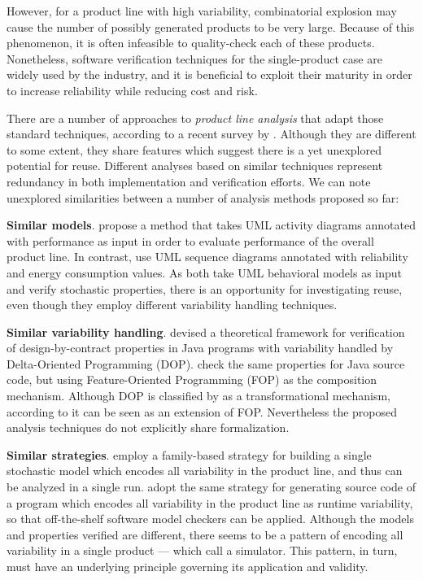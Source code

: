 However, for a product line with high variability, combinatorial explosion may
cause the number of possibly generated products to be very large. Because of
this phenomenon, it is often infeasible to quality-check each of these
products.
Nonetheless, software verification techniques for the single-product case
are widely used by the industry, and it is beneficial to exploit their
maturity in order to increase reliability while reducing cost and risk.

There are a number of approaches to \emph{product line analysis} that adapt those
standard techniques, according to a recent survey by \cite{Thum2014}.
Although they are different to some extent, they share features which suggest
there is a yet unexplored potential for reuse.
Different analyses based on similar techniques represent redundancy in both
implementation and verification efforts.
We can note unexplored similarities between a number of analysis methods proposed so far:


    \textbf{Similar models}. \cite{kowal_scaling_2015} propose a method that takes UML activity diagrams
        annotated with performance as input in order to evaluate performance
        of the overall product line.
        In contrast, \cite{Ghezzi2013} use UML sequence diagrams annotated
        with reliability and energy consumption values.
        As both take UML behavioral models as input and verify
        stochastic properties, there is an opportunity for investigating
        reuse, even though they employ different variability handling
        techniques.

    \textbf{Similar variability handling}. \cite{Hahnle2012} devised a theoretical framework for verification
        of design-by-contract properties in Java programs with variability
        handled by Delta-Oriented Programming (DOP).
        \cite{Thum2013} check the same properties for Java source code, but
        using Feature-Oriented Programming (FOP) as the composition mechanism.
        Although DOP is classified by \cite{DOPTransformational} as a
        transformational mechanism, according to \cite{Schaefer2010} it can
        be seen as an extension of FOP.
        Nevertheless the proposed analysis techniques do not explicitly share
        formalization.

    \textbf{Similar strategies}. \cite{kowal_scaling_2015} employ a family-based strategy for building a
        single stochastic model which encodes all variability in the product
        line, and thus can be analyzed in a single run.
        \cite{ApelSimulator} adopt the same strategy for generating source code
        of a program which encodes all variability in the product line as
        runtime variability, so that off-the-shelf software model checkers
        can be applied.
        Although the models and properties verified are different, there
        seems to be a pattern of encoding all variability in a single
        product --- which \cite{ApelSimulator} call a simulator. This
        pattern, in turn, must have an underlying principle governing its
        application and validity.


